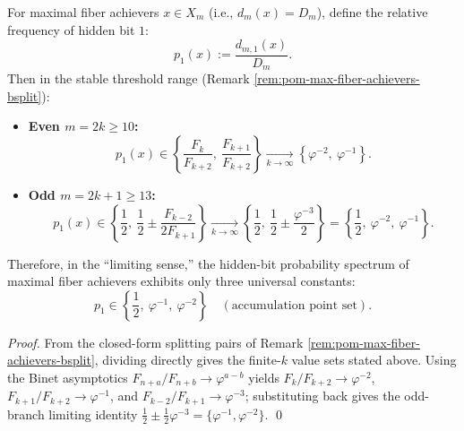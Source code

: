 \begin{corollary}\label{cor:pom-max-fiber-achievers-hidden-bit-prob-spectrum}
For maximal fiber achievers \(x\in X_m\) (i.e., \(d_m(x)=D_m\)), define the relative frequency of hidden bit \(1\):
\[
p_1(x):=\frac{d_{m,1}(x)}{D_m}.
\]
Then in the stable threshold range (Remark \ref{rem:pom-max-fiber-achievers-bsplit}):
\begin{itemize}
  \item \textbf{Even \(m=2k\ge 10\):}
  \[
  p_1(x)\in\left\{\frac{F_k}{F_{k+2}},\ \frac{F_{k+1}}{F_{k+2}}\right\}
  \xrightarrow[k\to\infty]{}\left\{\varphi^{-2},\ \varphi^{-1}\right\}.
  \]
  \item \textbf{Odd \(m=2k+1\ge 13\):}
  \[
  p_1(x)\in\left\{\frac12,\ \frac12\pm\frac{F_{k-2}}{2F_{k+1}}\right\}
  \xrightarrow[k\to\infty]{}\left\{\frac12,\ \frac12\pm\frac{\varphi^{-3}}{2}\right\}
  =
  \left\{\frac12,\ \varphi^{-2},\ \varphi^{-1}\right\}.
  \]
\end{itemize}
Therefore, in the ``limiting sense,'' the hidden-bit probability spectrum of maximal fiber achievers exhibits only three universal constants:
\[
\boxed{\;
p_1\in\left\{\frac12,\ \varphi^{-1},\ \varphi^{-2}\right\}\quad(\text{accumulation point set}).
\;}
\]
\end{corollary}
\begin{proof}
From the closed-form splitting pairs of Remark \ref{rem:pom-max-fiber-achievers-bsplit}, dividing directly gives the finite-\(k\) value sets stated above.
Using the Binet asymptotics \(F_{n+a}/F_{n+b}\to \varphi^{a-b}\) yields
\(
F_k/F_{k+2}\to\varphi^{-2}
\),
\(
F_{k+1}/F_{k+2}\to\varphi^{-1}
\),
and
\(
F_{k-2}/F_{k+1}\to\varphi^{-3}
\);
substituting back gives the odd-branch limiting identity
\(
\tfrac12\pm\tfrac12\varphi^{-3}=\{\varphi^{-1},\varphi^{-2}\}
\).
\qed
\end{proof}




